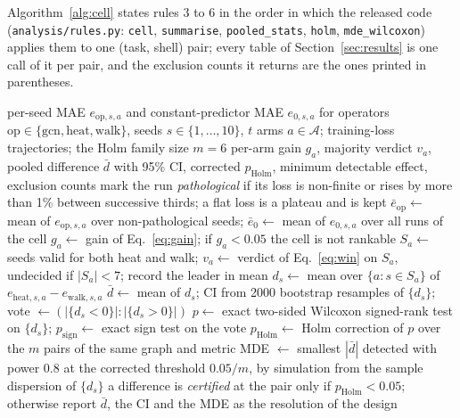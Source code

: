 \documentclass[preprint,11pt,3p]{elsarticle}
\begin{document}
Algorithm~\ref{alg:cell} states rules 3 to 6 in the order in which the released code
(\texttt{analysis/rules.py}: \texttt{cell}, \texttt{summarise}, \texttt{pooled\_stats},
\texttt{holm}, \texttt{mde\_wilcoxon}) applies them to one (task, shell) pair; every table of
Section~\ref{sec:results} is one call of it per pair, and the exclusion counts it returns are
the ones printed in parentheses.

\begin{algorithm}[htbp]
\caption{Reading one (task, shell) pair (rules 3 to 6 of Section~\ref{sec:protocol})}
\label{alg:cell}
\begin{algorithmic}[1]
\Require per-seed MAE $e_{\mathrm{op},s,a}$ and constant-predictor MAE $e_{0,s,a}$ for operators
  $\mathrm{op}\in\{\mathrm{gcn},\mathrm{heat},\mathrm{walk}\}$, seeds $s\in\{1,\dots,10\}$,
  $t$ arms $a\in\mathcal{A}$; training-loss trajectories; the Holm family size $m=6$
\Ensure per-arm gain $g_{a}$, majority verdict $v_{a}$, pooled difference $\bar d$ with 95\%
  CI, corrected $p_{\mathrm{Holm}}$, minimum detectable effect, exclusion counts
                                       
  \State mark the run \emph{pathological} if its loss is non-finite or rises by more than
    1\% between successive thirds; a flat loss is a plateau and is kept
\EndFor
{}                                          
  \State $\bar e_{\mathrm{op}} \gets$ mean of $e_{\mathrm{op},s,a}$ over non-pathological seeds;
    $\bar e_{0} \gets$ mean of $e_{0,s,a}$ over all runs of the cell
  \State $g_{a} \gets$ gain of Eq.~\eqref{eq:gain}; if $g_{a}<0.05$ the cell is not rankable
  \State $S_{a} \gets$ seeds valid for both heat and walk; $v_{a} \gets$ verdict of
    Eq.~\eqref{eq:win} on $S_{a}$, undecided if $|S_{a}|<7$; record the leader in mean
\EndFor
{}                                                        
  \State $d_{s} \gets$ mean over $\{a : s\in S_{a}\}$ of $e_{\mathrm{heat},s,a}-e_{\mathrm{walk},s,a}$
\EndFor
\State $\bar d \gets$ mean of $d_{s}$; CI from 2000 bootstrap resamples of $\{d_{s}\}$;
  vote $\gets (|\{d_{s}<0\}| : |\{d_{s}>0\}|)$
\State $p \gets$ exact two-sided Wilcoxon signed-rank test on $\{d_{s}\}$; $p_{\mathrm{sign}}
  \gets$ exact sign test on the vote
\State $p_{\mathrm{Holm}} \gets$ Holm correction of $p$ over the $m$ pairs of the same graph and metric
\State MDE $\gets$ smallest $|\bar d|$ detected with power 0.8 at the corrected threshold
  $0.05/m$, by simulation from the sample dispersion of $\{d_{s}\}$
\State \Return a difference is \emph{certified} at the pair only if $p_{\mathrm{Holm}}<0.05$;
  otherwise report $\bar d$, the CI and the MDE as the resolution of the design
\end{algorithmic}
\end{algorithm}
\end{document}
